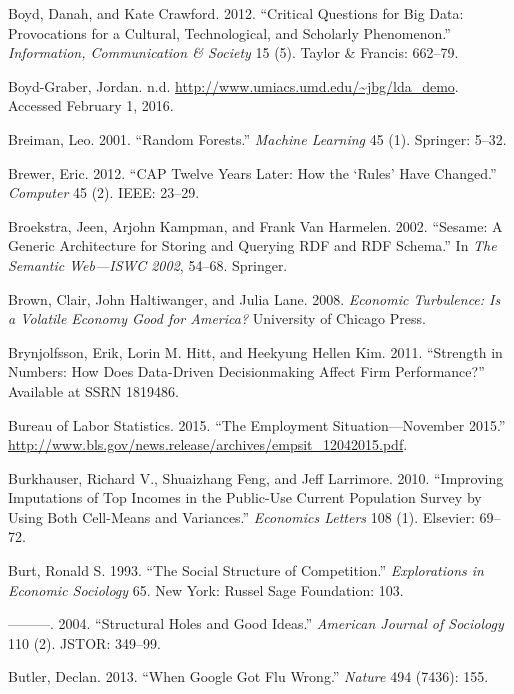 \documentclass[]{krantz}
\begin{document}
\hypertarget{ref-boyd2012critical}{}
Boyd, Danah, and Kate Crawford. 2012. ``Critical Questions for Big Data:
Provocations for a Cultural, Technological, and Scholarly Phenomenon.''
\emph{Information, Communication \& Society} 15 (5). Taylor \& Francis:
662--79.

\hypertarget{ref-NSFsearch}{}
Boyd-Graber, Jordan. n.d. \url{http://www.umiacs.umd.edu/~jbg/lda_demo}.
Accessed February 1, 2016.

\hypertarget{ref-Breiman01}{}
Breiman, Leo. 2001. ``Random Forests.'' \emph{Machine Learning} 45 (1).
Springer: 5--32.

\hypertarget{ref-brewer2012cap}{}
Brewer, Eric. 2012. ``CAP Twelve Years Later: How the `Rules' Have
Changed.'' \emph{Computer} 45 (2). IEEE: 23--29.

\hypertarget{ref-broekstra2002sesame}{}
Broekstra, Jeen, Arjohn Kampman, and Frank Van Harmelen. 2002. ``Sesame:
A Generic Architecture for Storing and Querying RDF and RDF Schema.'' In
\emph{The Semantic Web---ISWC 2002}, 54--68. Springer.

\hypertarget{ref-brown2008economic}{}
Brown, Clair, John Haltiwanger, and Julia Lane. 2008. \emph{Economic
Turbulence: Is a Volatile Economy Good for America?} University of
Chicago Press.

\hypertarget{ref-brynjolfsson2011strength}{}
Brynjolfsson, Erik, Lorin M. Hitt, and Heekyung Hellen Kim. 2011.
``Strength in Numbers: How Does Data-Driven Decisionmaking Affect Firm
Performance?'' Available at SSRN 1819486.

\hypertarget{ref-BLS2015}{}
Bureau of Labor Statistics. 2015. ``The Employment Situation---November
2015.''
\url{http://www.bls.gov/news.release/archives/empsit_12042015.pdf}.

\hypertarget{ref-burkhauser2010improving}{}
Burkhauser, Richard V., Shuaizhang Feng, and Jeff Larrimore. 2010.
``Improving Imputations of Top Incomes in the Public-Use Current
Population Survey by Using Both Cell-Means and Variances.''
\emph{Economics Letters} 108 (1). Elsevier: 69--72.

\hypertarget{ref-burt1993social}{}
Burt, Ronald S. 1993. ``The Social Structure of Competition.''
\emph{Explorations in Economic Sociology} 65. New York: Russel Sage
Foundation: 103.

\hypertarget{ref-burt2004structural}{}
---------. 2004. ``Structural Holes and Good Ideas.'' \emph{American
Journal of Sociology} 110 (2). JSTOR: 349--99.

\hypertarget{ref-butler2013google}{}
Butler, Declan. 2013. ``When Google Got Flu Wrong.'' \emph{Nature} 494
(7436): 155.
\end{document}
